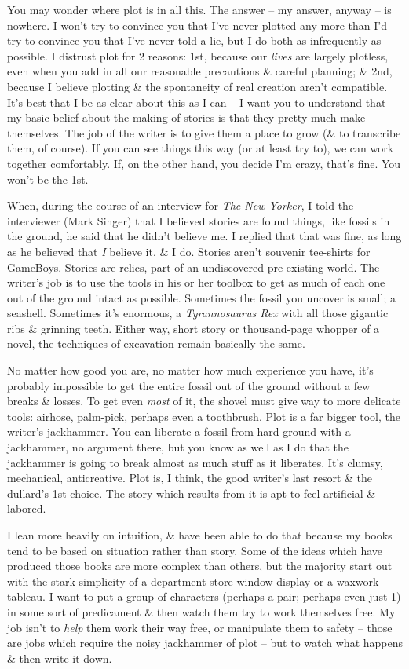 \documentclass{article}
\numberwithin{equation}{section}
\begin{document}
You may wonder where plot is in all this. The answer -- my answer, anyway -- is nowhere. I won't try to convince you that I've never plotted any more than I'd try to convince you that I've never told a lie, but I do both as infrequently as possible. I distrust plot for 2 reasons: 1st, because our \textit{lives} are largely plotless, even when you add in all our reasonable precautions \& careful planning; \& 2nd, because I believe plotting \& the spontaneity of real creation aren't compatible. It's best that I be as clear about this as I can -- I want you to understand that my basic belief about the making of stories is that they pretty much make themselves. The job of the writer is to give them a place to grow (\& to transcribe them, of course). If you can see things this way (or at least try to), we can work together comfortably. If, on the other hand, you decide I'm crazy, that's fine. You won't be the 1st.

When, during the course of an interview for \textit{The New Yorker}, I told the interviewer (Mark Singer) that I believed stories are found things, like fossils in the ground, he said that he didn't believe me. I replied that that was fine, as long as he believed that \textit{I} believe it. \& I do. Stories aren't souvenir tee-shirts for GameBoys. Stories are relics, part of an undiscovered pre-existing world. The writer's job is to use the tools in his or her toolbox to get as much of each one out of the ground intact as possible. Sometimes the fossil you uncover is small; a seashell. Sometimes it's enormous, a \textit{Tyrannosaurus Rex} with all those gigantic ribs \& grinning teeth. Either way, short story or thousand-page whopper of a novel, the techniques of excavation remain basically the same.

No matter how good you are, no matter how much experience you have, it's probably impossible to get the entire fossil out of the ground without a few breaks \& losses. To get even \textit{most} of it, the shovel must give way to more delicate tools: airhose, palm-pick, perhaps even a toothbrush. Plot is a far bigger tool, the writer's jackhammer. You can liberate a fossil from hard ground with a jackhammer, no argument there, but you know as well as I do that the jackhammer is going to break almost as much stuff as it liberates. It's clumsy, mechanical, anticreative. Plot is, I think, the good writer's last resort \& the dullard's 1st choice. The story which results from it is apt to feel artificial \& labored.

I lean more heavily on intuition, \& have been able to do that because my books tend to be based on situation rather than story. Some of the ideas which have produced those books are more complex than others, but the majority start out with the stark simplicity of a department store window display or a waxwork tableau. I want to put a group of characters (perhaps a pair; perhaps even just 1) in some sort of predicament \& then watch them try to work themselves free. My job isn't to \textit{help} them work their way free, or manipulate them to safety -- those are jobs which require the noisy jackhammer of plot -- but to watch what happens \& then write it down.
\end{document}
